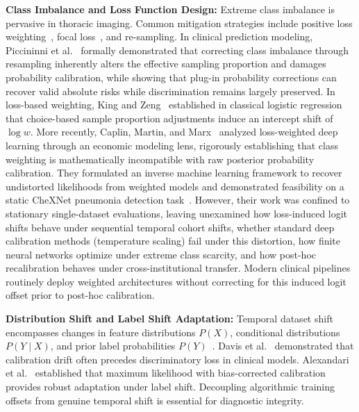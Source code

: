 \documentclass[preprint,12pt]{elsarticle}
\begin{document}
\textbf{Class Imbalance and Loss Function Design:} Extreme class imbalance is pervasive in thoracic imaging. Common mitigation strategies include positive loss weighting~\cite{buda2018systematic, rajpurkar2017chexnet}, focal loss~\cite{lin2017focal}, and re-sampling. In clinical prediction modeling, Piccininni et al.~\cite{piccininni2024understanding} formally demonstrated that correcting class imbalance through resampling inherently alters the effective sampling proportion and damages probability calibration, while showing that plug-in probability corrections can recover valid absolute risks while discrimination remains largely preserved. In loss-based weighting, King and Zeng~\cite{king2001logistic} established in classical logistic regression that choice-based sample proportion adjustments induce an intercept shift of $\log w$. More recently, Caplin, Martin, and Marx~\cite{caplin2022calibrating} analyzed loss-weighted deep learning through an economic modeling lens, rigorously establishing that class weighting is mathematically incompatible with raw posterior probability calibration. They formulated an inverse machine learning framework to recover undistorted likelihoods from weighted models and demonstrated feasibility on a static CheXNet pneumonia detection task~\cite{rajpurkar2017chexnet}. However, their work was confined to stationary single-dataset evaluations, leaving unexamined how loss-induced logit shifts behave under sequential temporal cohort shifts, whether standard deep calibration methods (temperature scaling) fail under this distortion, how finite neural networks optimize under extreme class scarcity, and how post-hoc recalibration behaves under cross-institutional transfer. Modern clinical pipelines routinely deploy weighted architectures without correcting for this induced logit offset prior to post-hoc calibration.

\textbf{Distribution Shift and Label Shift Adaptation:} Temporal dataset shift encompasses changes in feature distributions $P(X)$, conditional distributions $P(Y \mid X)$, and prior label probabilities $P(Y)$~\cite{finlayson2021clinician}. Davis et al.~\cite{davis2020detection} demonstrated that calibration drift often precedes discriminatory loss in clinical models. Alexandari et al.~\cite{alexandari2020maximum} established that maximum likelihood with bias-corrected calibration provides robust adaptation under label shift. Decoupling algorithmic training offsets from genuine temporal shift is essential for diagnostic integrity.
\end{document}
